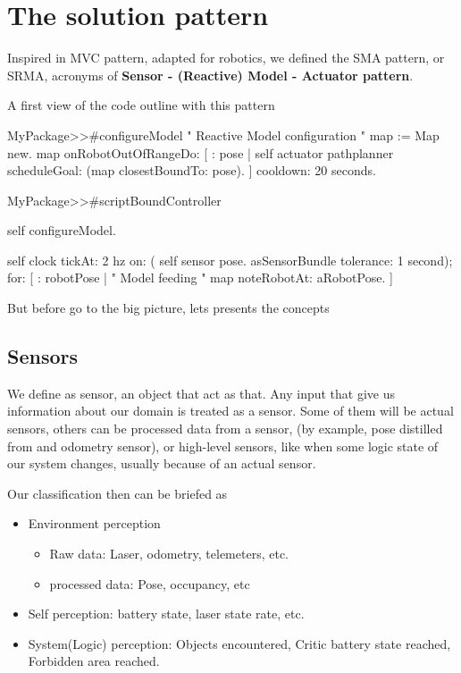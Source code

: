 \documentclass[a4paper,10pt,twoside]{book}
\begin{document}
					\section{The solution pattern}
					
					
					Inspired in MVC pattern, adapted for robotics, we defined the SMA pattern, or SRMA, acronyms of 
					\textbf{Sensor - (Reactive) Model - Actuator pattern}. 
					
					
					
					A first view of the code outline with this pattern
					
					
					\begin{code}
			
			MyPackage>>#configureModel
				" Reactive Model configuration "
				map := Map new.
				map onRobotOutOfRangeDo: [ : pose | 
					self actuator pathplanner scheduleGoal: (map closestBoundTo: pose).
				] cooldown: 20 seconds.
		
		
			MyPackage>>#scriptBoundController
			
				self configureModel.
				
				self clock tickAt: 2 hz on: ({
					self sensor pose.
				} asSensorBundle tolerance: 1 second);
				  for: [
				 : robotPose |
					" Model feeding "
				 	 map noteRobotAt: aRobotPose.
				]
						
						
					\end{code}
					
					
					
					But before go to the big picture, lets presents the concepts
					
					
					
					\subsection{Sensors}
					
					 We define as sensor, an object that act as that. Any input that give us information about our domain is treated as a sensor. Some of them will be actual sensors, others can be processed data from a sensor, (by example, pose distilled from and odometry sensor), or high-level sensors, like when some logic state of our system changes, usually because of an actual sensor.
					
					Our classification then can be briefed as
					
					\begin{itemize}
						\item Environment perception \begin{itemize}
								\item Raw data:  Laser, odometry, telemeters, etc. 
								\item processed data: Pose, occupancy, etc
							\end{itemize}
						\item Self perception: battery state, laser state rate, etc.
						\item System(Logic) perception: Objects encountered, Critic battery state reached, Forbidden area reached. 
					\end{itemize}
					
\end{document}
